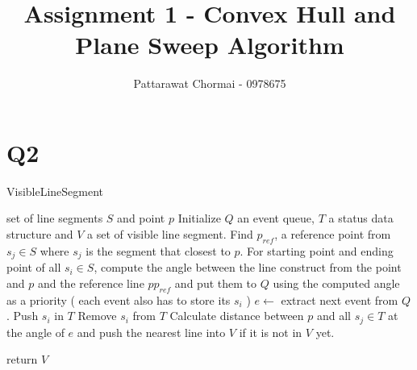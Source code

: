\documentclass[12pt]{article}
\begin{document}
\title{Assignment 1 - Convex Hull and Plane Sweep Algorithm}
\author{
	Pattarawat Chormai - 0978675 \\
}
\maketitle

\section*{Q2}

\begin{algorithm}[h]
  \caption{VisibleLineSegment}
  \label{alg:visiblesg}
  \begin{algorithmic}
      \Require set of line segments $S$ and point $p$
      \State Initialize $Q$ an event queue, $T$ a status data structure and $V$ a set of visible line segment.
      \State Find $p_{ref}$, a reference point from $s_j \in S$ where $s_j$ is the segment that closest to $p$.
      \State For starting point and ending point of all $s_i \in S$, compute the angle between the line construct from the point and $p$ and the reference line $pp_{ref}$ and put them to $Q$ using the computed angle as a priority ( each event also has to store its $s_i$ )
      	\State $e \leftarrow $ extract next event from $Q$.
		\State Push $s_i$ in $T$
		\State Remove $s_i$ from $T$
	\EndIf
	\State Calculate distance between $p$ and all $s_j \in T$ at the angle of $e$ and push the nearest line into $V$ if it is not in $V$ yet.
      \EndWhile
      
      \State return $V$
\end{algorithmic}
\end{algorithm}
\end{document}
